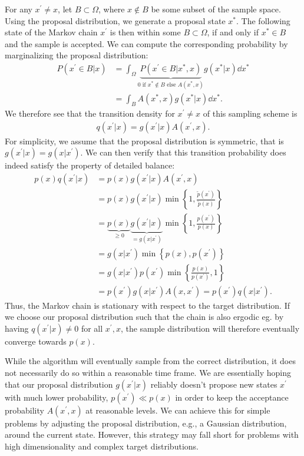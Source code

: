 For any $x^\prime \neq x$, let $B\subset \Omega$, where $x\not\in B$ be some subset of the sample space. 
Using the proposal distribution, we generate a proposal state $x^\ast$.
The following state of the Markov chain $x^\prime$ is then within some $B \subset \Omega$, if and only if $x^\ast \in B$ and the sample is accepted.
We can compute the corresponding probability by marginalizing the proposal distribution:
\begin{align}
        P(x^\prime \in B | x ) 
        &= \int_\Omega \underbrace{P( x^\prime \in B | x^\ast,x)}_{\text{$0$ if $x^\ast \not \in B$ else $A(x^\ast, x)$}} g(x^\ast|x) \dd{x^\ast}\\
        &= \int_B A(x^\ast, x) g(x^\ast|x) \dd{x^\ast}.
\end{align}
We therefore see that the transition density for $x^\prime \neq x$ of this sampling scheme is
\begin{align}
    q(x^\prime|x) = g(x^\prime | x) A(x^\prime, x).
\end{align} 
For simplicity, we assume that the proposal distribution is symmetric, that is $g(x^\prime | x) = g(x | x^\prime)$.
We can then verify that this transition probability does indeed satisfy the property of detailed balance:
\begin{align}
    p(x)q(x^\prime|x) &= p(x)g(x^\prime | x) A(x^\prime, x) \\
    &= p(x)g(x^\prime | x) \min\left\{1,  \frac{\tilde{p}(x^\prime)}{ \tilde{p}(x)}\right\} \\
    &= \underbrace{p(x)}_{\geq 0} \underbrace{g(x^\prime | x)}_{=g(x | x^\prime)} \min\left\{1,  \frac{p(x^\prime)}{p(x)}\right\} \\
    &= g(x | x^\prime) \min\left\{p(x), p(x^\prime)\right\} \\
    &= g(x | x^\prime) p(x^\prime) \min\left\{\frac{p(x)}{p(x^\prime)}, 1\right\} \\
    &= p(x^\prime) g(x | x^\prime)  A(x ,x^\prime) = p(x^\prime) q(x|x^\prime).
\end{align}
Thus, the Markov chain is stationary with respect to the target distribution.
If we choose our proposal distribution such that the chain is also ergodic eg. by having $q(x^\prime|x) \neq 0$ for all $x^\prime,x$, the sample distribution will therefore eventually converge towards $p(x)$. 

While the algorithm will eventually sample from the correct distribution, it does not necessarily do so within a reasonable time frame. 
We are essentially hoping that our proposal distribution $g(x^\prime | x)$ reliably doesn't propose new states $x^\prime$ with much lower probability, $p(x^\prime) \ll p(x) $ in order to keep the acceptance probability $A(x^\prime, x)$ at reasonable levels. 
We can achieve this for simple problems by adjusting the proposal distribution, e.g., a Gaussian distribution, around the current state.
However, this strategy may fall short for problems with high dimensionality and complex target distributions.

